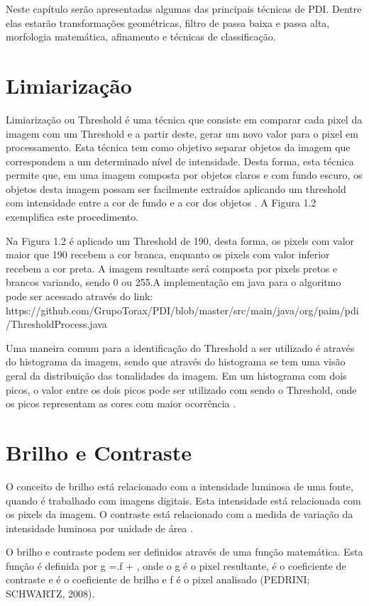 \documentclass[
	12pt,				%
	oneside,			%
	a4paper,			%
	english,			%
	french,				%
	spanish,			%
	brazil,				%
	]{abntex2}
\begin{document}
Neste capítulo serão apresentadas algumas das principais técnicas de PDI. Dentre elas estarão transformações geométricas, filtro de passa baixa e passa alta, morfologia matemática, afinamento e técnicas de classificação.
\section{Limiarização}

Limiarização ou Threshold é uma técnica que consiste em comparar cada pixel da imagem com um Threshold e a partir deste, gerar um novo valor para o pixel em processamento. Esta técnica tem como objetivo separar objetos da imagem que correspondem a um determinado nível de intensidade. Desta forma, esta técnica permite que, em uma imagem composta por objetos claros e com fundo escuro, os objetos desta imagem possam ser facilmente extraídos aplicando um threshold com intensidade entre a cor de fundo e a cor dos objetos \cite{gonzalesWoods:2008}. A Figura 1.2 exemplifica este procedimento.

Na Figura 1.2 é aplicado um Threshold de 190, desta forma, os pixels com valor maior que 190 recebem a cor branca, enquanto os pixels com valor inferior recebem a cor preta. A imagem resultante será composta por pixels pretos e brancos variando, sendo 0 ou 255.A implementação em java para o algoritmo pode ser acessado através do link:
https://github.com/GrupoTorax/PDI/blob/master/src/main/java/org/paim/pdi/ThresholdProcess.java 

Uma maneira comum para a identificação do Threshold a ser utilizado é através do histograma da imagem, sendo que através do histograma se tem uma visão geral da distribuição das tonalidades da imagem. Em um histograma com dois picos, o valor entre os dois picos pode ser utilizado com sendo o Threshold, onde os picos representam as cores com maior ocorrência  \cite{gonzalesWoods:2008}. 

\section{Brilho e Contraste}
O conceito de brilho está relacionado com a intensidade luminosa de uma fonte, quando é trabalhado com imagens digitais. Esta intensidade está relacionada com os pixels da imagem. O contraste está relacionado com a medida de variação da intensidade luminosa por unidade de área \cite{gonzalesWoods:2008}.

O brilho e contraste podem ser definidos através de uma função matemática. Esta função é definida por g =.f + , onde o g é o pixel resultante,  é o coeficiente de contraste e  é o coeficiente de brilho e f é o pixel analisado (PEDRINI; SCHWARTZ, 2008).
\end{document}

